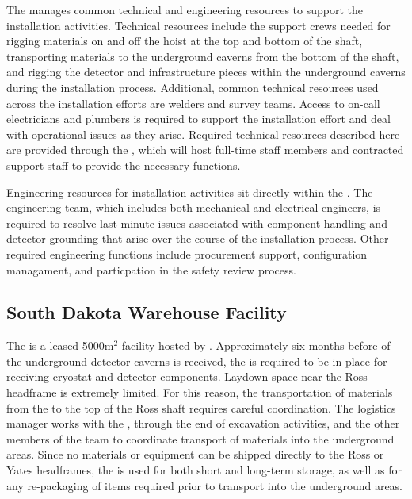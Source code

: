 The  manages common technical and engineering resources to
support the installation activities.  Technical resources include the
support crews needed for rigging materials on and off the hoist at the
top and bottom of the shaft, transporting materials to the underground
caverns from the bottom of the shaft, and rigging the detector and
infrastructure pieces within the underground caverns during the
installation process.  Additional, common technical resources used
across the installation efforts are welders and survey teams. Access
to on-call electricians and plumbers is required to support the
installation effort and deal with operational issues as they arise.
Required technical resources described here are provided through the
, which will host full-time staff members and contracted
support staff to provide the necessary functions.

Engineering resources for  installation activities 
sit directly within the .  The engineering team, which 
includes both mechanical and electrical engineers, is required to 
resolve last minute issues associated with component handling and 
detector grounding that arise over the course of the installation 
process.  Other required engineering functions include procurement
support, configuration managament, and particpation in the safety 
review process.

\subsection{South Dakota Warehouse Facility}

The  is a leased 5000m$^2$ facility hosted by 
.  Approximately six months before 
of the underground detector caverns is received, the  
is required to be in place for receiving cryostat and detector 
components.  Laydown space near the Ross headframe is extremely 
limited.  For this reason, the transportation of materials from 
the  to the top of the Ross shaft requires careful 
coordination. The  logistics manager works with 
the , through the end of excavation activities, and 
the other members of the  team to coordinate transport 
of materials into the underground areas.  Since no materials or 
equipment can be shipped directly to the Ross or Yates headframes, 
the  is used for both short and long-term storage, as 
well as for any re-packaging of items required prior to transport 
into the underground areas. 


